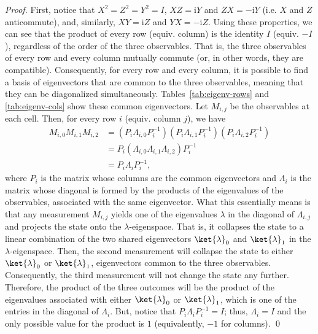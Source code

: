 \documentclass{llncs}
\newcommand{\ci}{\mathrm{i}}
\begin{document}
\begin{proof}
  \label{proof:product}
  First, notice that \(X^{2} = Z^{2} = Y^{2} = I\), \(XZ = \ci{}Y\)
  and \(ZX = -\ci{}Y\) (i.e. \(X\) and \(Z\) anticommute), and,
  similarly, \(XY = \ci{}Z\) and \(YX = -\ci{}Z\). Using these
  properties, we can see that the product of every row (equiv. column)
  is the identity \(I\) (equiv. \(-I\)), regardless of the order of
  the three observables.  That is, the three observables of every row
  and every column mutually commute (or, in other words, they are
  compatible).  Consequently, for every row and every column, it is
  possible to find a basis of eigenvectors that are common to the
  three observables, meaning that they can be diagonalized
  simultaneously. Tables~\ref{tab:eigenv-rows} and \ref{tab:eigenv-cols} show
  these common eigenvectors. Let \(M_{i, j}\) be the observables at
  each cell.  Then, for every row \(i\) (equiv. column \(j\)), we have
  \begin{align}
    M_{i, 0} M_{i, 1} M_{i, 2}
    &= (P_{i} \Lambda_{i, 0} P_{i}^{-1}) (P_{i}\Lambda_{i, 1}P_{i}^{-1}) (P_{i}\Lambda_{i, 2}P_{i}^{-1})
      \nonumber \\
    &= P_{i}(\Lambda_{i, 0} \Lambda_{i, 1} \Lambda_{i, 2})P_{i}^{-1} \nonumber \\
    &= P_{i}\Lambda_{i}P_{i}^{-1},
  \end{align}
  where \(P_{i}\) is the matrix whose columns are the common
  eigenvectors and \(\Lambda_{i}\) is the matrix whose diagonal is
  formed by the products of the eigenvalues of the observables,
  associated with the same eigenvector. What this essentially means is
  that any measurement \(M_{i, j}\) yields one of the eigenvalues
  \(\lambda\) in the diagonal of \(\Lambda_{i, j}\) and projects the
  state onto the \(\lambda\)-eigenspace. That is, it collapses the
  state to a linear combination of the two shared eigenvectors
  \(\ket{\lambda}_{0}\) and \(\ket{\lambda}_{1}\) in the
  \(\lambda\)-eigenspace. Then, the second measurement will collapse
  the state to either \(\ket{\lambda}_{0}\) or \(\ket{\lambda}_{1}\),
  eigenvectors common to the three observables.  Consequently, the
  third measurement will not change the state any further. Therefore,
  the product of the three outcomes will be the product of the
  eigenvalues associated with either \(\ket{\lambda}_{0}\) or
  \(\ket{\lambda}_{1}\), which is one of the entries in the diagonal
  of \(\Lambda_{i}\). But, notice that
  \(P_{i}\Lambda_{i}P_{i}^{-1} = I\); thus, \(\Lambda_{i} = I\) and
  the only possible value for the product is \(1\) (equivalently,
  \(-1\) for columns). \qed
\end{proof}
\end{document}
